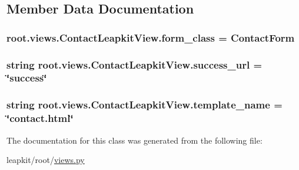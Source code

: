 \subsection{Member Data Documentation}
\hypertarget{classroot_1_1views_1_1_contact_leapkit_view_a9113e0f2bd6d60c2903df9e2c4b7d088}{
\subsubsection[{form\-\_\-class}]{\setlength{\rightskip}{0pt plus 5cm}root.\-views.\-Contact\-Leapkit\-View.\-form\-\_\-class = {\bf Contact\-Form}\hspace{0.3cm}{\ttfamily [static]}}}\label{classroot_1_1views_1_1_contact_leapkit_view_a9113e0f2bd6d60c2903df9e2c4b7d088}
\hypertarget{classroot_1_1views_1_1_contact_leapkit_view_ab7402fe5dccd1ab87377ce11e8cef1ee}{
\subsubsection[{success\-\_\-url}]{\setlength{\rightskip}{0pt plus 5cm}string root.\-views.\-Contact\-Leapkit\-View.\-success\-\_\-url = \char`\"{}success\char`\"{}\hspace{0.3cm}{\ttfamily [static]}}}\label{classroot_1_1views_1_1_contact_leapkit_view_ab7402fe5dccd1ab87377ce11e8cef1ee}
\hypertarget{classroot_1_1views_1_1_contact_leapkit_view_ad2ac561aa8443a14a1fcbc1aba7f9376}{
\subsubsection[{template\-\_\-name}]{\setlength{\rightskip}{0pt plus 5cm}string root.\-views.\-Contact\-Leapkit\-View.\-template\-\_\-name = \char`\"{}contact.\-html\char`\"{}\hspace{0.3cm}{\ttfamily [static]}}}\label{classroot_1_1views_1_1_contact_leapkit_view_ad2ac561aa8443a14a1fcbc1aba7f9376}


The documentation for this class was generated from the following file\-:\begin{DoxyCompactItemize}
\item 
leapkit/root/\hyperlink{root_2views_8py}{views.\-py}\end{DoxyCompactItemize}
